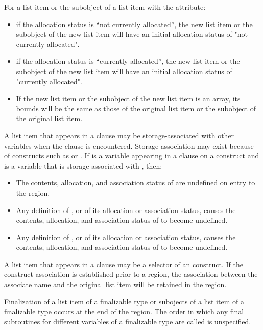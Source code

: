 For a list item or the subobject of a list item with the  attribute:

\begin{itemize}
\item if the allocation status is ``not currently allocated'', the new list item or the subobject 
of the new list item will have an initial allocation status of "not currently allocated".

\item if the allocation status is ``currently allocated'', the new list item or the subobject of 
the new list item will have an initial allocation status of "currently allocated".

\item If the new list item or the subobject of the new list item is an array, its bounds will be 
the same as those of the original list item or the subobject of the original list item.
\end{itemize}

A list item that appears in a  clause may be storage-associated with other 
variables when the  clause is encountered. Storage association may exist 
because of constructs such as  or . If  is a variable appearing 
in a  clause on a construct and  is a variable that is storage-associated with , then:

\begin{itemize}
\item The contents, allocation, and association status of  are undefined on entry to the region.

\item Any definition of , or of its allocation or association status, causes the contents, 
allocation, and association status of  to become undefined. 

\item Any definition of , or of its allocation or association status, causes the contents, 
allocation, and association status of  to become undefined. 
\end{itemize}

A list item that appears in a  clause may be a selector of an  
construct. If the construct association is established prior to a  region, the 
association between the associate name and the original list item will be retained in the 
region.

Finalization of a list item of a finalizable type or subojects of a
list item of a finalizable type occurs at the end of the region. The
order in which any final subroutines for different variables of a
finalizable type are called is unspecified.
\fortranspecificend

